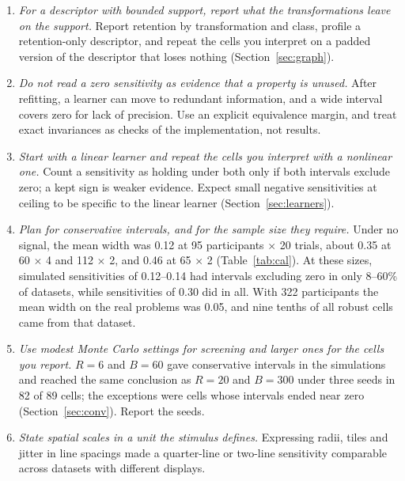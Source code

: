 \documentclass[11pt]{article}
\begin{document}
\begin{enumerate}
\item \emph{For a descriptor with bounded support, report what the transformations leave on the support.} Report retention by transformation and class, profile a retention-only descriptor, and repeat the cells you interpret on a padded version of the descriptor that loses nothing (Section~\ref{sec:graph}).
\item \emph{Do not read a zero sensitivity as evidence that a property is unused.} After refitting, a learner can move to redundant information, and a wide interval covers zero for lack of precision. Use an explicit equivalence margin, and treat exact invariances as checks of the implementation, not results.
\item \emph{Start with a linear learner and repeat the cells you interpret with a nonlinear one.} Count a sensitivity as holding under both only if both intervals exclude zero; a kept sign is weaker evidence. Expect small negative sensitivities at ceiling to be specific to the linear learner (Section~\ref{sec:learners}).
\item \emph{Plan for conservative intervals, and for the sample size they require.} Under no signal, the mean width was 0.12 at 95 participants $\times$ 20 trials, about 0.35 at 60 $\times$ 4 and 112 $\times$ 2, and 0.46 at 65 $\times$ 2 (Table~\ref{tab:cal}). At these sizes, simulated sensitivities of 0.12--0.14 had intervals excluding zero in only 8--60\% of datasets, while sensitivities of 0.30 did in all. With 322 participants the mean width on the real problems was 0.05, and nine tenths of all robust cells came from that dataset.
\item \emph{Use modest Monte Carlo settings for screening and larger ones for the cells you report.} $R = 6$ and $B = 60$ gave conservative intervals in the simulations and reached the same conclusion as $R = 20$ and $B = 300$ under three seeds in 82 of 89 cells; the exceptions were cells whose intervals ended near zero (Section~\ref{sec:conv}). Report the seeds.
\item \emph{State spatial scales in a unit the stimulus defines.} Expressing radii, tiles and jitter in line spacings made a quarter-line or two-line sensitivity comparable across datasets with different displays.
\end{enumerate}
\end{document}
